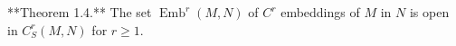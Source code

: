 **Theorem 1.4.** The set $\operatorname{Emb}^r(M,N)$ of $C^r$ embeddings of $M$ in $N$ is open in $C^r_S(M,N)$ for $r \geq 1$.
